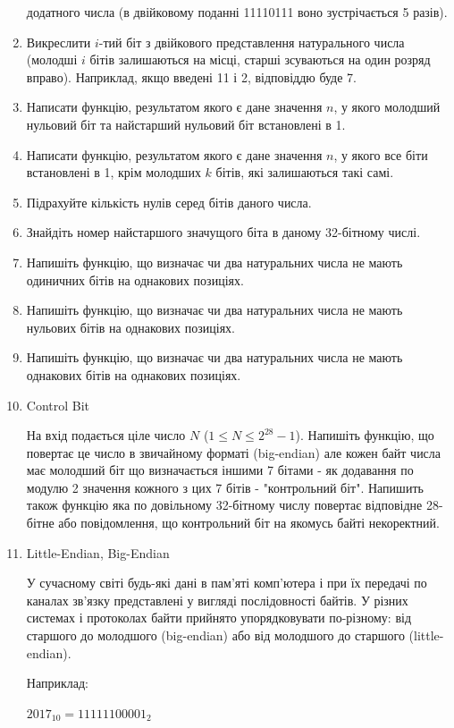\documentclass[]{article}
\begin{document}
\begin{enumerate}
  додатного числа (в двійковому поданні 11110111 воно зустрічається 5
  разів).
\item
  Викреслити $i$-тий біт з двійкового представлення натурального числа
  (молодші $i$ бітів залишаються на місці, старші зсуваються на один
  розряд вправо). Наприклад, якщо введені 11 і 2, відповіддю буде 7.
\item
  Написати функцію, результатом якого є дане значення $n$, у якого 
молодший нульовий біт та найстарший нульовий біт встановлені в 1.
\item
  Написати функцію, результатом якого є дане значення $n$, у якого все
  біти встановлені в 1, крім молодших $k$ бітів, які залишаються такі самі.
\item
  Підрахуйте кількість нулів серед бітів даного числа.
\item
  Знайдіть номер найстаршого значущого біта в даному 32-бітному числі.
\item
  Напишіть функцію, що визначає чи два натуральних числа не мають
  одиничних бітів на однакових позиціях.
\item
  Напишіть функцію, що визначає чи два натуральних числа не мають
  нульових бітів на однакових позиціях.
\item
  Напишіть функцію, що визначає чи два натуральних числа не мають
  однакових бітів на однакових позиціях.

\item Control Bit

На вхід подається ціле число $N $ ($1\le N \le 2^{28}-1 $).
Напишіть функцію, що повертає це число в звичайному форматі (big-endian) але
кожен байт числа має молодший біт що визначається іншими 7 бітами -
як додавання по модулю 2 значення кожного з цих 7 бітів - "контрольний біт".
Напишить також функцію яка по довільному 32-бітному числу повертає відповідне 28-бітне
або повідомлення, що контрольний біт на якомусь байті некоректний.

\item

Little-Endian, Big-Endian

У сучасному світі будь-які дані в пам'яті комп'ютера і при їх передачі по каналах зв'язку представлені у вигляді послідовності байтів. У різних системах і протоколах байти прийнято упорядковувати по-різному: від старшого до молодшого (big-endian) або від молодшого до старшого (little-endian).

Наприклад: 

$2017_{10} = 11111100001_{2}$


\end{enumerate}
\end{document}
